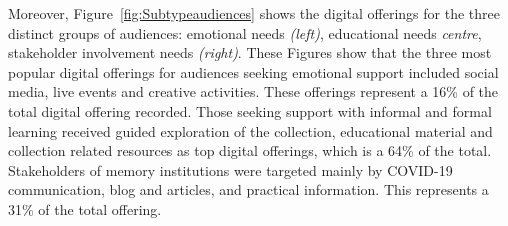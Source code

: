 \documentclass{egpubl}
\begin{document}



Moreover, Figure~\ref{fig:Subtypeaudiences} shows the digital offerings for the three distinct groups of audiences: emotional needs  \emph{(left)}, educational needs \emph{centre}, stakeholder involvement needs \emph{(right)}. These Figures show that the three most popular digital offerings for audiences seeking emotional support included social media, live events and creative activities. These offerings represent a 16\% of the total digital offering recorded. Those seeking support with informal and formal learning received guided exploration of the collection, educational material and collection related resources as top digital offerings, which is a 64\% of the total. Stakeholders of memory institutions were targeted mainly by COVID-19 communication, blog and articles, and practical information. This represents a 31\% of the total offering.
\end{document}
